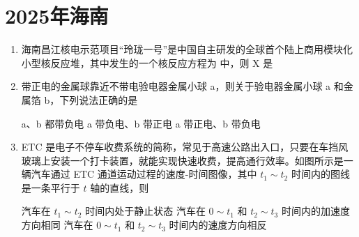 \documentclass[\gkver]{gaokaozhenti}
\begin{document}
\chapter{2025年海南}

\begin{enumerate}
\item
海南昌江核电示范项目“玲珑一号”是中国自主研发的全球首个陆上商用模块化小型核反应堆，其中发生的一个核反应方程为  中，则 X 是

{}
{}
{}


\item
带正电的金属球靠近不带电验电器金属小球 a，则关于验电器金属小球 a 和金属箔 b，下列说法正确的是


{a、b 都带负电}
{a 带负电、b 带正电}
{a 带正电、b 带负电}


\item
ETC 是电子不停车收费系统的简称，常见于高速公路出入口，只要在车挡风玻璃上安装一个打卡装置，就能实现快速收费，提高通行效率。如图所示是一辆汽车通过 ETC 通道运动过程的速度-时间图像，其中 $t_{1} \sim t_{2}$ 时间内的图线是一条平行于 $t$ 轴的直线，则


{汽车在 $t_{1} \sim t_{2}$ 时间内处于静止状态}
{汽车在 $0 \sim t_{1}$ 和 $t_{2} \sim t_{3}$ 时间内的加速度方向相同}
{汽车在 $0 \sim t_{1}$ 和 $t_{2} \sim t_{3}$ 时间内的速度方向相反}


\end{enumerate}
\end{document}
